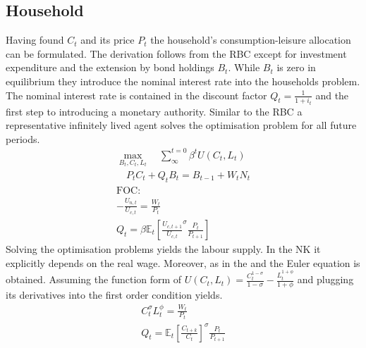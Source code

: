 \documentclass[12pt,a4paper,english]{article} %
\newcommand{\E}{\mathbb{E}} %
\begin{document}
	\subsection{Household}
	Having found $C_t$ and its price $P_t$ the household's consumption-leisure allocation can be formulated. The derivation follows from the RBC except for investment expenditure and the extension by bond holdings $B_t$. While $B_t$ is zero in equilibrium they introduce the nominal interest rate into the households problem. The nominal interest rate is contained in the discount factor $Q_t = \frac{1}{1+i_t}$ and the first step to introducing a monetary authority. Similar to the RBC a representative infinitely lived agent solves the optimisation problem for all future periods. 
	\begin{equation}
		\begin{aligned}
			\max_{B_t, C_t, L_t} \quad \sum_{\infty}^{t=0} \beta^{t} U(C_{t}, L_{t}) \\
			\quad P_t C_t + Q_t B_t = B_{t-1} + W_t N_t \\
			\textrm{FOC:} \\
				- \frac{U_{n,t}}{U_{c, t}} = \frac{W_t}{P_t}\\
				Q_t = \beta \E_t \left[ \frac{U_{c, t+1}}{U_{c,t}}^\sigma \frac{P_t}{P_{t+1}} \right] 			
		\end{aligned}
	\end{equation}
	Solving the optimisation problems yields the labour supply. In the NK it explicitly depends on the real wage. Moreover, as in the and the Euler equation is obtained. Assuming the function form of $U(C_t, L_t) = \frac{C_t^{1-\sigma}}{{1-\sigma}} - \frac{L_t^{1+\phi}}{1+\phi}$ and plugging its derivatives into the first order condition yields.
		\begin{equation} \label{eq:nk_hh_foc}
		\begin{aligned}
			C_t^\sigma L_t^\phi	= \frac{W_t}{P_t} \\
			Q_{t} = \E_t \left[ \frac{C_{t+k}}{C_t} \right]^\sigma \frac{P_t}{P_{t+1}}
		\end{aligned}
	\end{equation}
	
\end{document}
